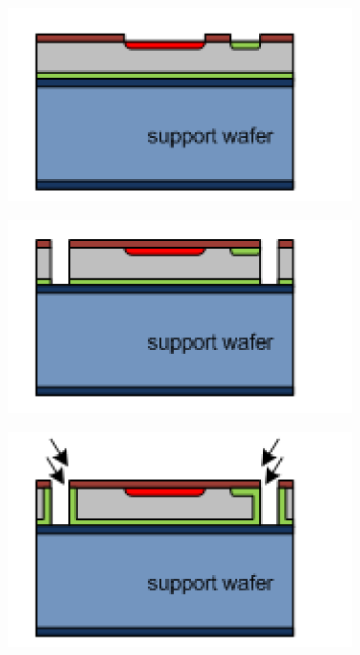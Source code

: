 \begin{figure}[htbp]
  \begin{subfigure}[b]{0.3\textwidth}
    \centering
    \includegraphics[width=\textwidth]{figures/ActiveEdge/advacamProcess/wafer_4}
    \caption{}
  \end{subfigure}\hfill
  \begin{subfigure}[b]{0.3\textwidth}
    \includegraphics[width=\textwidth]{figures/ActiveEdge/advacamProcess/wafer_5}
    \caption{}
  \end{subfigure}\hfill
  \begin{subfigure}[b]{0.3\textwidth}
    \includegraphics[width=\textwidth]{figures/ActiveEdge/advacamProcess/wafer_6}
    \caption{}
  \end{subfigure} \\


\end{figure}
